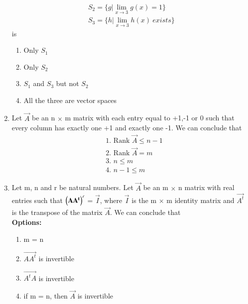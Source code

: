 \begin{enumerate}[label=\thesection.\arabic*.,ref=\thesection.\theenumi]
\begin{align}
S_2 = \{g|\lim_{x\to3} g(x) = 1\}\\
S_3 = \{h|\lim_{x\to3} h(x)~exists\}
\end{align}
is
\begin{enumerate}
\item Only $S_1$ 
\item Only $S_2$
\item $S_1$ and $S_3$ but not $S_2$ 
\item All the three are vector spaces
\end{enumerate}
%
\solution

\item Let $\vec{A}$ be an n $\times$ m matrix with each entry equal to +1,-1 or 0 such that every column has exactly one +1 and exactly one -1. We can conclude that\\
\begin{align}
    &\mbox{1. Rank } \vec{A}\leq n-1\\
    &\mbox{2. Rank } \vec{A}=m\\    
    &\mbox{3. }n\leq m\\
    &\mbox{4. }n-1\leq m
\end{align}
%
%
\solution

\item Let m, n and r be natural numbers. Let $\vec{A}$ be an m $\times$ n matrix with real entries such that $\left(\mathbf{AA^t}\right)^r$ = $\vec{I}$, where $\vec{I}$ is the m $\times$ m identity matrix and $\vec{A^t}$ is the transpose of the matrix $\vec{A}$. We can conclude that\\
\textbf{Options:}
\begin{enumerate}
\item m = n
\item $\vec{AA^t}$ is invertible
\item $\vec{A^tA}$ is invertible
\item if m = n, then $\vec{A}$ is invertible
\end{enumerate}
%
%
\solution



\end{enumerate}
